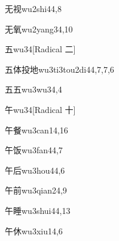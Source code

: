 \begin{verbete}{无视}{wu2shi4}{4,8}
\end{verbete}

\begin{verbete}{无氧}{wu2yang3}{4,10}
\end{verbete}

\begin{verbete}{五}{wu3}{4}[Radical 二]
\end{verbete}

\begin{verbete}{五体投地}{wu3ti3tou2di4}{4,7,7,6}
\end{verbete}

\begin{verbete}{五五}{wu3wu3}{4,4}
\end{verbete}

\begin{verbete}{午}{wu3}{4}[Radical 十]
\end{verbete}

\begin{verbete}{午餐}{wu3can1}{4,16}
\end{verbete}

\begin{verbete}{午饭}{wu3fan4}{4,7}
\end{verbete}

\begin{verbete}{午后}{wu3hou4}{4,6}
\end{verbete}

\begin{verbete}{午前}{wu3qian2}{4,9}
\end{verbete}

\begin{verbete}{午睡}{wu3shui4}{4,13}
\end{verbete}

\begin{verbete}{午休}{wu3xiu1}{4,6}
\end{verbete}

